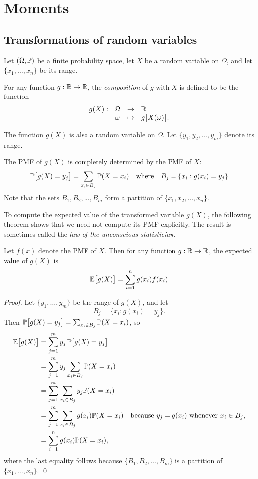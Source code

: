 \chapter{Moments}\label{chap:moments}

\section{Transformations of random variables}
Let $(\Omega,\mathbb{P})$ be a finite probability space, let $X$ be a random variable on $\Omega$, and let $\{x_1,\ldots,x_n\}$ be its range.

\bigskip
For any function $g:\mathbb{R}\to\mathbb{R}$, the \emph{composition} of $g$ with $X$ is defined to be the function
\[\begin{array}{rlcl}
g(X): 	& \Omega & \to		& \mathbb{R} \\
		& \omega & \mapsto	& g\big[X(\omega)\big].
\end{array}\]

The function $g(X)$ is also a random variable on $\Omega$. Let $\{y_1,y_2,\ldots,y_m\}$ denote its range.

\bigskip
The PMF of $g(X)$ is completely determined by the PMF of $X$:
\[
\mathbb{P}\big[g(X)=y_j\big] = \sum_{x_i\in B_j}\mathbb{P}(X=x_i) 
\quad\text{where}\quad 
B_j  = \{x_i:g(x_i)=y_j\}
\]
Note that the sets $B_1,B_2,\ldots,B_m$ form a partition of $\{x_1,x_2,\ldots,x_n\}$.


\bigskip
To compute the expected value of the transformed variable $g(X)$, the following theorem shows that we need not compute its PMF explicitly. The result is sometimes called the \emph{law of the unconscious statistician}. 
\begin{theorem}\label{thm:lus}
Let $f(x)$ denote the PMF of $X$. Then for any function $g:\mathbb{R}\to\mathbb{R}$, the expected value of $g(X)$ is
\[
\mathbb{E}\big[g(X)\big] = \sum_{i=1}^n g(x_i)f(x_i)
\]
\end{theorem}

\begin{proof}
Let $\{y_1,\ldots,y_m\}$ be the range of $g(X)$, and let
\[
B_j  = \{x_i:g(x_i)=y_j\}.
\]
Then $\mathbb{P}\big[g(X)=y_j\big] = \sum_{x_i\in B_j}\mathbb{P}(X=x_i)$, so
\begin{align*}
\mathbb{E}\big[g(X)\big]
	& = \sum_{j=1}^m y_j\,\mathbb{P}\big[g(X)=y_j\big] \\
	& = \sum_{j=1}^m y_j\sum_{x_i\in B_j} \mathbb{P}(X=x_i) \\
	& = \sum_{j=1}^m \sum_{x_i\in B_j} y_j\mathbb{P}(X=x_i) \\
	& = \sum_{j=1}^m \sum_{x_i\in B_j} g(x_i)\mathbb{P}(X=x_i) \text{\quad because $y_j=g(x_i)$ whenever $x_i\in B_j$,}\\
	& = \sum_{i=1}^n g(x_i)\mathbb{P}(X=x_i),
\end{align*}
where the last equality follows because $\{B_1,B_2,\ldots,B_m\}$ is a partition of $\{x_1,\ldots,x_n\}$.
\qed
\end{proof}

